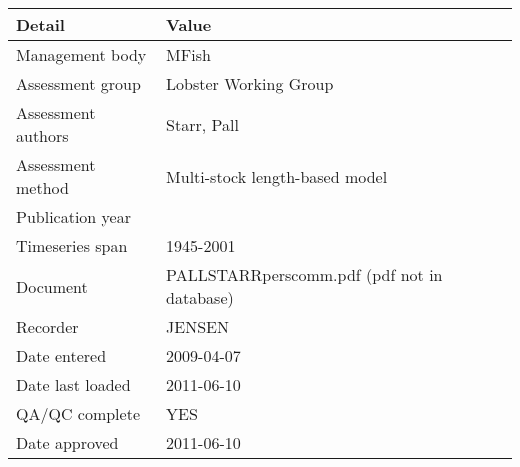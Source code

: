 \begin{table}[htb]
\centering
\begin{tabular}{ll}
\toprule
Detail & Value \\
\midrule
Management body    & MFish                                       \\
Assessment group   & Lobster Working Group                       \\
Assessment authors & Starr, Pall                                 \\
Assessment method  & Multi-stock length-based model              \\
Publication year   &                                             \\
Timeseries span    & 1945-2001                                   \\
Document           & PALLSTARRperscomm.pdf (pdf not in database) \\
Recorder           & JENSEN                                      \\
Date entered       & 2009-04-07                                  \\
Date last loaded   & 2011-06-10                                  \\
QA/QC complete     & YES                                         \\
Date approved      & 2011-06-10                                  \\
\bottomrule
\end{tabular}
\label{tab:assessdet}
\end{table}
